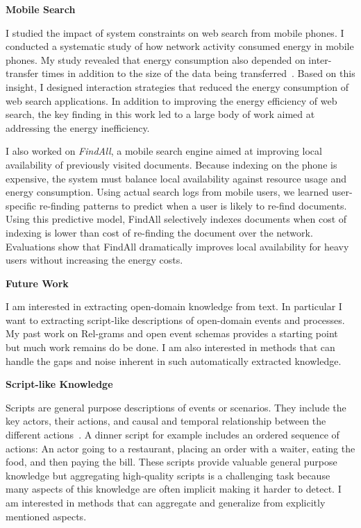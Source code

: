 \documentclass[a4paper,11pt,onecolumn]{article}
\begin{document}
{\bf Mobile Search}

I studied the impact of system constraints on web search from mobile phones. I conducted a systematic study of how network activity consumed energy in mobile phones. My study revealed that energy consumption also depended on inter-transfer times in addition to the size of the data being transferred~\cite{balasubramanian-imc09}. Based on this insight, I designed interaction strategies that reduced the energy consumption of web search applications. In addition to improving the energy efficiency of web search, the key finding in this work led to a large body of work aimed at addressing the energy inefficiency.

I also worked on {\em FindAll}, a mobile search engine aimed at improving local availability of previously visited documents. Because indexing on the phone is expensive, the system must balance local availability against resource usage and energy consumption. Using actual search logs from mobile users, we learned user-specific re-finding patterns to predict when a user is likely to re-find documents. Using this predictive model, FindAll selectively indexes documents when cost of indexing is lower than cost of re-finding the document over the network. Evaluations show that FindAll dramatically improves local availability for heavy users without increasing the energy costs.

{\bf Future Work}

I am interested in extracting open-domain knowledge from text. In particular I want to extracting script-like descriptions of open-domain events and processes. My past work on Rel-grams and open event schemas provides a starting point but much work remains do be done. I am also interested in methods that can handle the gaps and noise inherent in such automatically extracted knowledge.

{\bf Script-like Knowledge}

Scripts are general purpose descriptions of events or scenarios. They include the key actors, their actions, and causal and temporal relationship between the different actions~\cite{schank-scripts75}. A dinner script for example includes an ordered sequence of actions: An actor going to a restaurant, placing an order with a waiter, eating the food, and then paying the bill. These scripts provide valuable general purpose knowledge but aggregating high-quality scripts is a challenging task because many aspects of this knowledge are often implicit making it harder to detect. I am interested in methods that can aggregate and generalize from explicitly mentioned aspects. %
\end{document}
